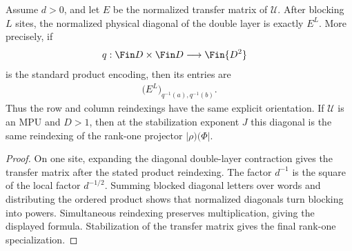 \begin{lemma}
    \label{thm:mpu_blocked_double_layer_diagonal}
    \leanok
    Assume $d>0$, and let $E$ be the normalized transfer matrix of
    $\mathcal U$.  After blocking $L$ sites, the normalized physical diagonal of the double layer is
    exactly $E^L$.  More precisely, if
    \begin{align}
        q:\Fin D\times\Fin D & \longrightarrow\Fin{D^2}
    \end{align}
    is the standard product encoding, then its entries are
    \begin{align}
        \bigl(E^L\bigr)_{q^{-1}(a),q^{-1}(b)}.
    \end{align}
    Thus the row and column reindexings have the same explicit orientation.
    If $\mathcal U$ is an MPU and $D>1$, then at the stabilization exponent
    $J$ this diagonal is the same reindexing of the rank-one projector
    $|\rho)(\Phi|$.
\end{lemma}

\begin{proof}\leanok
    On one site, expanding the diagonal double-layer contraction gives the
    transfer matrix after the stated product reindexing.  The factor
    $d^{-1}$ is the square of the local factor $d^{-1/2}$.  Summing blocked
    diagonal letters over words and distributing the ordered product shows
    that normalized diagonals turn blocking into powers.  Simultaneous
    reindexing preserves multiplication, giving the displayed formula.
    Stabilization of the transfer matrix gives the final rank-one specialization.
\end{proof}


